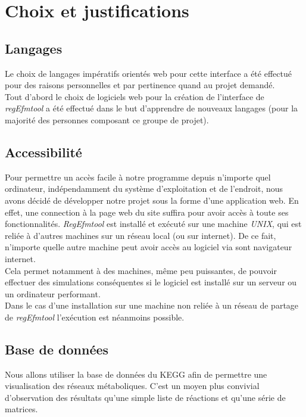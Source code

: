 \chapter{Choix et justifications}

\section{Langages}
Le choix de langages impératifs orientés web pour cette interface a été effectué pour des raisons personnelles et par pertinence quand au projet demandé.\\
Tout d'abord le choix de logiciels web pour la création de l'interface de \emph{regEfmtool} a été effectué dans le but d'apprendre de nouveaux langages (pour la majorité des personnes composant ce groupe de projet).

\section{Accessibilité}
Pour permettre un accès facile à notre programme depuis n'importe quel ordinateur, indépendamment du système d'exploitation et de l'endroit, nous avons décidé de développer notre projet sous la forme d'une application web. En effet, une connection à la page web du site suffira pour avoir accès à toute ses fonctionnalités. \emph{RegEfmtool} est installé et exécuté sur une machine \emph{UNIX}, qui est reliée à d'autres machines sur un réseau local (ou sur internet). De ce fait, n'importe quelle autre machine peut avoir accès au logiciel via sont navigateur internet.\\
Cela permet notamment à des machines, même peu puissantes, de pouvoir effectuer des simulations conséquentes si le logiciel est installé sur un serveur ou un ordinateur performant.\\
Dans le cas d'une installation sur une machine non reliée à un réseau de partage de \emph{regEfmtool} l'exécution est néanmoins possible.

\section{Base de données}
Nous allons utiliser la base de données du KEGG afin de permettre une visualisation des réseaux métaboliques. C'est un moyen plus convivial d'observation des résultats qu'une simple liste de réactions et qu'une série de matrices. 
